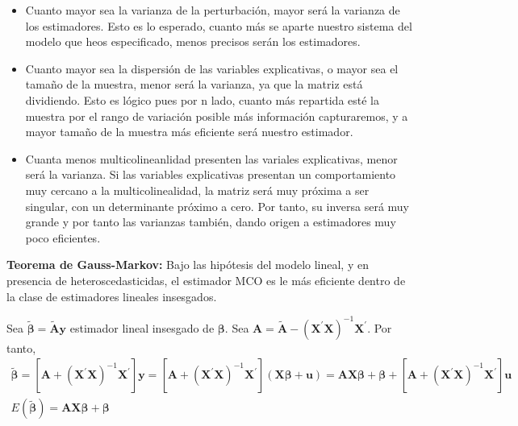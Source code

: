 \begin{itemize}
\item Cuanto mayor sea la varianza de la perturbaci\'on, mayor ser\'a la varianza de los estimadores. Esto es lo esperado, cuanto m\'as se aparte nuestro sistema del modelo que heos especificado, menos precisos ser\'an los estimadores.
\item Cuanto mayor sea la dispersi\'on de las variables explicativas, o mayor sea el tama\~no de la muestra, menor ser\'a la varianza, ya que la matriz est\'a dividiendo. Esto es l\'ogico pues por n lado, cuanto m\'as repartida est\'e la muestra por el rango de variaci\'on posible m\'as informaci\'on capturaremos, y a mayor tama\~no de la muestra m\'as eficiente ser\'a nuestro estimador.
\item Cuanta menos multicolineanlidad presenten las variales explicativas, menor ser\'a la varianza. Si las variables explicativas presentan un comportamiento muy cercano a la multicolinealidad, la matriz ser\'a muy pr\'oxima a ser singular, con un determinante pr\'oximo a cero. Por tanto, su inversa ser\'a muy grande y por tanto las varianzas tambi\'en, dando origen a estimadores muy poco eficientes.
\end{itemize}



\begin{teorema}
\textbf{Teorema de Gauss-Markov:} Bajo las hip\'otesis del modelo lineal, y en presencia de heteroscedasticidas, el estimador MCO es le m\'as eficiente dentro de la clase de estimadores lineales insesgados.
\end{teorema}


Sea $\tilde{\boldsymbol{\beta}}=\tilde{\boldsymbol{A}}\boldsymbol{y}$
estimador lineal insesgado de $\boldsymbol{\beta}$. Sea $\boldsymbol{A}=\tilde{\boldsymbol{A}}-\left(\boldsymbol{X}^{\prime}\boldsymbol{X}\right)^{-1}\boldsymbol{X}^{\prime}$.
Por tanto,
\begin{equation*}
\begin{array}{c}
\tilde{\boldsymbol{\beta}}=\left[\boldsymbol{A}+\left(\boldsymbol{X}^{\prime}\boldsymbol{X}\right)^{-1}\boldsymbol{X}^{\prime}\right]\boldsymbol{y}=\left[\boldsymbol{A}+\left(\boldsymbol{X}^{\prime}\boldsymbol{X}\right)^{-1}\boldsymbol{X}^{\prime}\right]\left(\boldsymbol{X\beta}+\boldsymbol{u}\right)=\boldsymbol{A}\boldsymbol{X\beta}+\boldsymbol{\beta}+\left[\boldsymbol{A}+\left(\boldsymbol{X}^{\prime}\boldsymbol{X}\right)^{-1}\boldsymbol{X}^{\prime}\right]\boldsymbol{u}\\
E\left(\tilde{\boldsymbol{\beta}}\right)=\boldsymbol{A}\boldsymbol{X\beta}+\boldsymbol{\beta}
\end{array}
\end{equation*}


